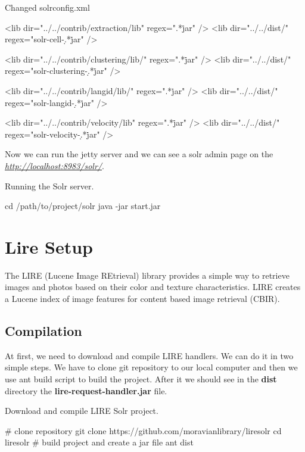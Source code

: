 \documentclass[12pt,a4paper]{report}
\begin{document}
\begin{listing}[H]
\caption{Changed solrconfig.xml}
\begin{xmlcode}
<lib dir="../../contrib/extraction/lib" regex=".*\.jar" />
<lib dir="../../dist/" regex="solr-cell-\d.*\.jar" />

<lib dir="../../contrib/clustering/lib/" regex=".*\.jar" />
<lib dir="../../dist/" regex="solr-clustering-\d.*\.jar" />

<lib dir="../../contrib/langid/lib/" regex=".*\.jar" />
<lib dir="../../dist/" regex="solr-langid-\d.*\.jar" />

<lib dir="../../contrib/velocity/lib" regex=".*\.jar" />
<lib dir="../../dist/" regex="solr-velocity-\d.*\.jar" />
\end{xmlcode}
\end{listing}

Now we can run the jetty server and we can see a solr admin page on the \textit{\url{http://localhost:8983/solr/}}.

\begin{listing}[H]
\caption{Running the Solr server.}
\begin{bashcode}
cd /path/to/project/solr
java -jar start.jar
\end{bashcode}
\end{listing}

\section{Lire Setup}

The LIRE (Lucene Image REtrieval) library provides a simple way to retrieve images and  photos based on their color and texture characteristics. LIRE creates a Lucene index of image features for content based image retrieval (CBIR).\cite{lire}

\subsection{Compilation}

At first, we need to download and compile LIRE handlers. We can do it in two simple steps. We have to clone git repository to our local computer and then we use ant build script to build the project. After it we should see in the \textbf{dist} directory the \textbf{lire-request-handler.jar} file.

\begin{listing}[H]
\caption{Download and compile LIRE Solr project.}
\begin{bashcode}
# clone repository
git clone https://github.com/moravianlibrary/liresolr
cd liresolr
# build project and create a jar file
ant dist
\end{bashcode}
\end{listing}
\end{document}
